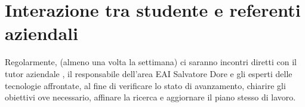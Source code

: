 \section*{Interazione tra studente e referenti aziendali}


Regolarmente, (almeno una volta la settimana) ci saranno incontri diretti con il tutor aziendale \nomeTutorAziendale \cognomeTutorAziendale, il responsabile dell’area EAI Salvatore Dore e gli esperti delle tecnologie affrontate, al fine di verificare lo stato di avanzamento, chiarire gli obiettivi ove necessario, affinare la ricerca e aggiornare il piano stesso di lavoro.
\newpage
